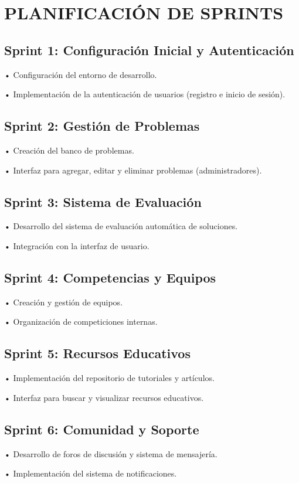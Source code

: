 \section{PLANIFICACIÓN DE SPRINTS}

\subsection{Sprint 1: Configuración Inicial y Autenticación}

	•	Configuración del entorno de desarrollo.
 
	•	Implementación de la autenticación de usuarios (registro e inicio de sesión).

\subsection{Sprint 2: Gestión de Problemas}

	•	Creación del banco de problemas.
 
	•	Interfaz para agregar, editar y eliminar problemas (administradores).

\subsection{Sprint 3: Sistema de Evaluación}

	•	Desarrollo del sistema de evaluación automática de soluciones.
 
	•	Integración con la interfaz de usuario.

\subsection{Sprint 4: Competencias y Equipos}

	•	Creación y gestión de equipos.
 
	•	Organización de competiciones internas.

\subsection{Sprint 5: Recursos Educativos}

	•	Implementación del repositorio de tutoriales y artículos.
 
	•	Interfaz para buscar y visualizar recursos educativos.

\subsection{Sprint 6: Comunidad y Soporte}

	•	Desarrollo de foros de discusión y sistema de mensajería.
 
	•	Implementación del sistema de notificaciones.